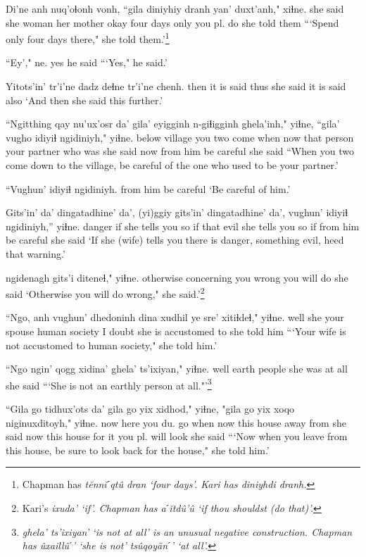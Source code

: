 \documentclass[12pt]{article}
\begin{document}
\gll Di'ne anh nuq'oɬonh vonh, ``gila  diniyhiy dranh yan' duxt'anh," xiɬne.
{she said} she woman {her mother} okay  four  days  only {you pl. do} {she told them}
\glt ```Spend only four days there," she told them.'\footnote{Chapman has \em t\u{e}nn\u{i}ˊqt\^u dran \em `four days'. Kari has \em diniyhdi dranh.}
\glend

\gll ``Ey'," ne.
yes  {he said}
\glt ```Yes," he said.'
\glend

\gll Yitots'in' tr'i'ne dadz deɬne  tr'i'ne chenh.
then  {it is said} thus {she said} {it is said} also  
\glt `And then she said this further.'
\glend

\gll ``Ngitthing qay nu'ux'osr da' gila' eyigginh n-giɬigginh ghela'inh,"  yiɬne, ``gila' vugho {idiyiɬ ngidiniyh,"} yiɬne.
below  village {you two come} when now {that person} {your partner} {who was} {she said} now {from him} {be careful} {she said}
\glt ``When you two come down to the village, be careful of the one who used to be your partner.'
\glend

\gll ``Vughun' {idiyiɬ ngidiniyh.}
{from him} {be careful}
\glt `Be careful of him.'
\glend

\gll Gits'in' da' dingatadhine' da', (yi)ggiy gits'in' dingatadhine' da', vughun' {idiyiɬ ngidiniyh,''} yiɬne.
danger  if {she tells you so}  if that evil {she tells you so}  if {from him}  {be careful}  {she said}
\glt `If she (wife) tells you there is danger, something evil, heed that warning.'
\glend

 ngidenagh gits'i diteneɬ," yiɬne.
otherwise {concerning you} wrong {you will do} {she said}
\glt `Otherwise you will do wrong," she said.'\footnote{Kari's \em ixuda' \em `if'. Chapman has \em aˊ\u{i}td\^u'\^u \em `if thou shouldst (do that)'.}
\glend

\gll ``Ngo, anh {vughun' dhedoninh} dina {xudhil ye} sre' xitiɬdeɬ,"   yiɬne.
well  she {your spouse} human society  {I doubt} {she is accustomed to} {she told him}
\glt ```Your wife is not accustomed to human society," she told him.'
\glend

\gll ``Ngo {ngin' qogg} xidina' ghela' ts'ixiyan," yiɬne.
well earth people  {she was} {at all} {she said}
\glt ```She is not an earthly person at all."'\footnote{\em ghela' ts'ixiyan' \em `is not at all' is an unusual negative construction. Chapman has \em\^uxaill\^uˊ' \em `she is not' \em ts\^uqoy\"anˊ' \em `at all'.}
\glend

\gll ``Gila go tidhux'ots  da' gila go yix xidhod," yiɬne, "gila go yix xoqo niginuxditoyh," yiɬne.
now here {you du. go} when now this house {away from} {she said} now this house {for it} {you pl. will look} {she said}
\glt ```Now when you leave from this house, be sure to look back for the house," she told him.'
\glend
\end{document}
